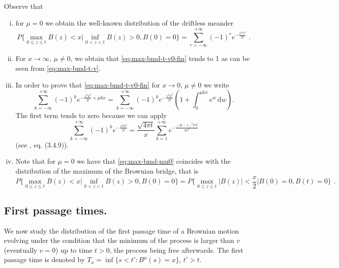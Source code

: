 %
%
Observe that  
\begin{enumerate}[(i)]
\item for $ \mu = 0 $ we obtain the well-known distribution of the driftless meander
%
\begin{equation}\label{eq:max-bmd-mu0}
P\bigg\{ \max_{0 \leq z \leq t} B(z) <x \Big |  \inf_{0 < z < t} B (z) > 0, B(0) = 0  \bigg\}
=
\sum_{r = - \infty} ^ { + \infty} 
(-1)^r
e^{  - \frac{x^2 r^2 }{2t}  } \,\, .
\end{equation}
%
\item 
For $  x \to \infty  $, $  \mu \neq 0 $, we obtain that  \eqref{eq:max-bmd-t-v0-fin} tends to 1
as can be seen from \eqref{eq:max-bmd-t-v}.
%
\item 
In order to prove that \eqref{eq:max-bmd-t-v0-fin} for $  x \to 0  $, $  \mu \neq 0 $ 
we write 
\[
\sum_{k=-\infty}^{+ \infty} (-1)^k e^{- \frac{x^2 k^2}{2t} + \mu k x } 
= 
\sum_{k=-\infty}^{+ \infty} (-1)^k e^{- \frac{x^2 k^2}{2t} } 
\left(
1 + \int_0^{\mu k x} e^w \, \mathrm d w 
\right). 
\]
The first term tends to zero because we can apply
%
\[
\sum_{k=-\infty}^{+ \infty} (-1)^k e^{- \frac{x^2 k^2}{2t} } 
= 
\frac{\sqrt{4 \pi t}}{x} 
\sum_{k=1}^{+ \infty} e^{- \frac{ (2k-1)^2 \pi^2 t }{4 x^2} } 
\]
(see \cite{durbin}, eq. (3.4.9)).
%
\item 
Note that for $  \mu = 0 $ we have that  \eqref{eq:max-bmd-mu0} coincides with the
distribution of the maximum of the Brownian bridge, that is
\begin{equation*}
P\bigg\{ \max_{0 \leq z \leq t} B(z) <x \Big |  \inf_{0 < z < t} B (z) > 0, B(0) = 0  \bigg\}
= 
P\bigg\{ \max_{0 \leq z \leq t} |B(z)| < \frac x2 \Big |  B(0) = 0, B(t) = 0  \bigg\} \,\, .
\end{equation*}
\end{enumerate}


%


%

\subsection{First passage times.}
We now study the distribution of the first passage time of a Brownian motion
 evolving 
under the condition that the minimum of the process is larger than $ v $ (eventually $ v=0 $) up to time $ t > 0$,
the process being free afterwards.
The first passage time is denoted  by $ T_x = \inf \{s < t' : B^\mu(s) = x\} $, $ t'>t $. 

